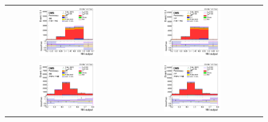 \begin{figure}[ht]
  \begin{center}
    \begin{tabular}{ccc}
      \includegraphics[width=0.49\textwidth]{figures/tW/fig/Result/ee/H_MLP_1jet_1bjet.png} &
      \includegraphics[width=0.49\textwidth]{figures/tW/fig/Result/mumu/H_MLP_1jet_1bjet.png}\\
      \includegraphics[width=0.49\textwidth]{figures/tW/fig/Result/ee/H_MLP_2jet_1bjet.png} &
      \includegraphics[width=0.49\textwidth]{figures/tW/fig/Result/mumu/H_MLP_2jet_1bjet.png}\\

\end{tabular}
\end{center}
\end{figure}
